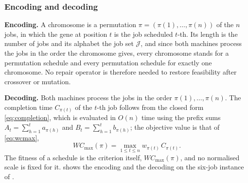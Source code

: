 \documentclass[12pt]{article}
\begin{document}
\begin{sloppypar}
        \subsubsection{Encoding and decoding}
        \textbf{Encoding.} A chromosome is a permutation $\pi=(\pi(1),\dots,\pi(n))$ of the $n$ jobs, in
        which the gene at position $t$ is the job scheduled $t$-th. Its length is the number of jobs and
        its alphabet the job set $\mathcal{J}$, and since both machines process the jobs in the order the
        chromosome gives, every chromosome stands for a permutation schedule and every permutation
        schedule for exactly one chromosome. No repair operator is therefore needed to restore feasibility
        after crossover or mutation.
        
        \textbf{Decoding.} Both machines process the jobs in the order $\pi(1),\dots,\pi(n)$. The
        completion time $C_{\pi(t)}$ of the $t$-th job follows from the closed form
        \cref{eq:completion}, which is evaluated in $O(n)$ time using the prefix sums
        $A_t=\sum_{h=1}^{t}a_{\pi(h)}$ and $B_t=\sum_{h=1}^{t}b_{\pi(h)}$; the objective
        value is that of \cref{eq:wcmax},
        \[
        W C_{\max}(\pi)=\max_{1\le t\le n}w_{\pi(t)}\,C_{\pi(t)}.
        \]
        The fitness of a schedule is the criterion itself, $W C_{\max}(\pi)$, and no normalised scale
        is fixed for it.  shows the encoding and
        the decoding on the six-job instance of .
        
        \begin{figure}[H]
            \centering
\end{figure}
\end{sloppypar}
\end{document}
